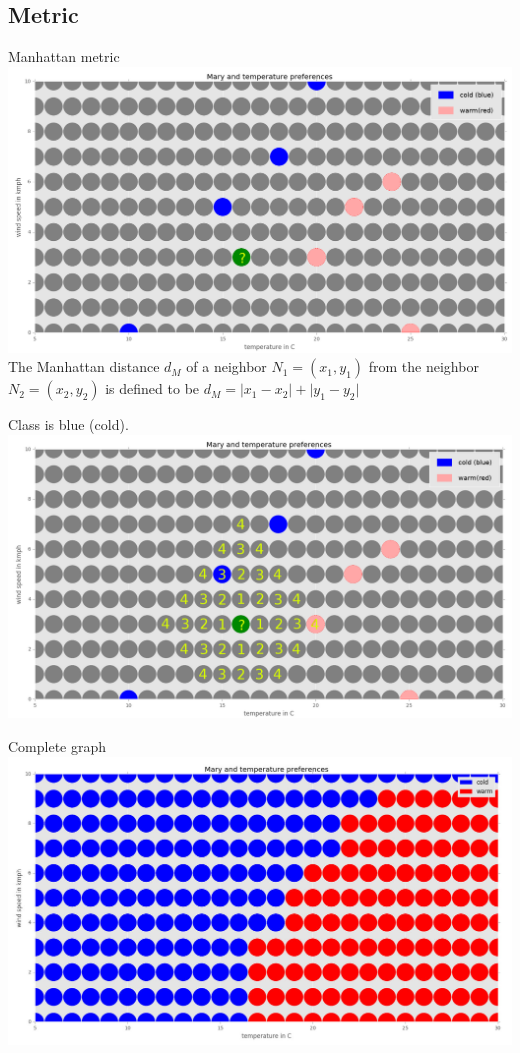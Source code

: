 \documentclass{beamer}
\begin{document}
\subsection{Metric}
\begin{frame}{Manhattan metric}
\includegraphics[width=\textwidth]{mary2.png}
The Manhattan distance $d_M$ of a neighbor $N_1=(x_1,y_1)$ from the
neighbor $N_2=(x_2,y_2)$ is defined to be $d_M=\lvert x_1-x_2 \rvert+\lvert y_1-y_2 \rvert$
\end{frame}

\begin{frame}{Class is blue (cold).}\vspace{10pt}
    \includegraphics[width=\textwidth]{mary3.png}

\end{frame}

\begin{frame}{Complete graph}\vspace{10pt}
    \includegraphics[width=\textwidth]{mary4.png}

\end{frame}
\end{document}
